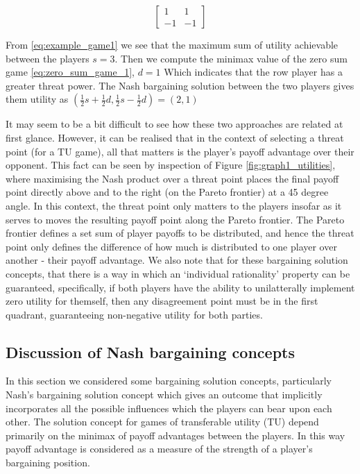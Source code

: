 \begin{equation}\label{eq:zero_sum_game_1} \begin{bmatrix}1 & 1\\ -1 & -1\end{bmatrix} \end{equation}

\begin{solution}[TU approach]
From \eqref{eq:example_game1} we see that the maximum sum of utility achievable between the players $s=3$. Then we compute the minimax value of the zero sum game \eqref{eq:zero_sum_game_1}, $d=1$ Which indicates that the row player has a greater threat power.
The Nash bargaining solution between the two players gives them utility as $(\frac{1}{2}s+\frac{1}{2}d,\frac{1}{2}s-\frac{1}{2}d) = (2,1)$
\end{solution}

It may seem to be a bit difficult to see how these two approaches are related at first glance.
However, it can be realised that in the context of selecting a threat point (for a TU game), all that matters is the player's payoff advantage over their opponent.
This fact can be seen by inspection of Figure \ref{fig:graph1_utilities}, where maximising the Nash product over a threat point places the final payoff point directly above and to the right (on the Pareto frontier) at a 45 degree angle.
In this context, the threat point only matters to the players insofar as it serves to moves the resulting payoff point along the Pareto frontier.
The Pareto frontier defines a set sum of player payoffs to be distributed, and hence the threat point only defines the difference of how much is distributed to one player over another - their payoff advantage. We also note that for these bargaining solution concepts, that there is a way in which an `individual rationality' property can be guaranteed, specifically, if both players have the ability to unilatterally implement zero utility for themself, then any disagreement point must be in the first quadrant, guaranteeing non-negative utility for both parties.

\subsection{Discussion of Nash bargaining concepts}


In this section we considered some bargaining solution concepts, particularly Nash's bargaining solution concept which gives an outcome that implicitly incorporates all the possible influences which the players can bear upon each other.
The solution concept for games of transferable utility (TU) depend primarily on the minimax of payoff advantages between the players.
In this way payoff advantage is considered as a measure of the strength of a player's bargaining position.

